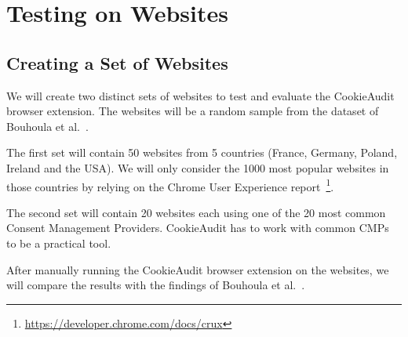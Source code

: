 \chapter{Testing on Websites}

\section{Creating a Set of Websites}

We will create two distinct sets of websites to test and evaluate the CookieAudit browser extension. 
The websites will be a random sample from the dataset of Bouhoula et al.~\cite{bouhoula2023automated}. 

The first set will contain 50 websites from 5 countries (France, Germany, Poland, Ireland and the USA).
We will only consider the 1000 most popular websites in those countries by relying on the Chrome User Experience report~\footnote{\href{https://developer.chrome.com/docs/crux}{https://developer.chrome.com/docs/crux}}. 

The second set will contain 20 websites each using one of the 20 most common Consent Management Providers. CookieAudit has to work with common CMPs to be a practical tool.

After manually running the CookieAudit browser extension on the websites, we will compare the results with the findings of Bouhoula et al.~\cite{bouhoula2023automated}.